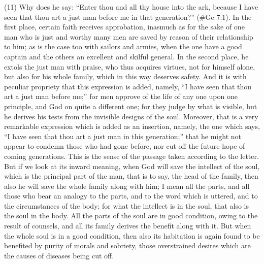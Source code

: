 (11) Why does he say: ``Enter thou and all thy house into the ark, because I have seen that thou art
a just man before me in that generation?'' (\#Ge 7:1). In the first place, certain faith receives
approbation, inasmuch as for the sake of one man who is just and worthy many men are saved by
reason of their relationship to him; as is the case too with sailors and armies, when the one have a
good captain and the others an excellent and skilful general. In the second place, he extols the just
man with praise, who thus acquires virtues, not for himself alone, but also for his whole family,
which in this way deserves safety. And it is with peculiar propriety that this expression is added,
namely, ``I have seen that thou art a just man before me;'' for men approve of the life of any one
upon one principle, and God on quite a different one; for they judge by what is visible, but he
derives his tests from the invisible designs of the soul. Moreover, that is a very remarkable
expression which is added as an insertion, namely, the one which says, ``I have seen that thou art
a just man in this generation;'' that he might not appear to condemn those who had gone before,
nor cut off the future hope of coming generations. This is the sense of the passage taken
according to the letter. But if we look at its inward meaning, when God will save the intellect of the
soul, which is the principal part of the man, that is to say, the head of the family, then also he will
save the whole family along with him; I mean all the parts, and all those who bear an analogy to the
parts, and to the word which is uttered, and to the circumstances of the body; for what the intellect
is in the soul, that also is the soul in the body. All the parts of the soul are in good condition, owing
to the result of counsels, and all its family derives the benefit along with it. But when the whole soul
is in a good condition, then also its habitation is again found to be benefited by purity of morals and
sobriety, those overstrained desires which are the causes of diseases being cut off.

